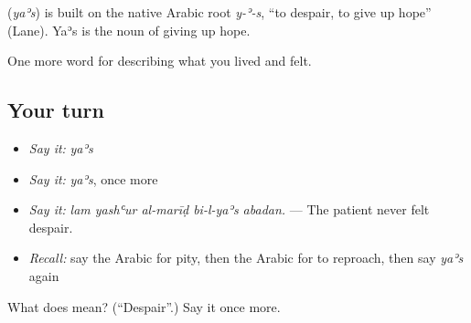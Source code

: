 \begin{cousinweb}
\textbf{} (\emph{yaʾs}) is built on the native Arabic root \emph{y-ʾ-s}, \textquotedblleft{}to despair, to give up hope\textquotedblright{} (Lane). Yaʾs is the noun of giving up hope.
\end{cousinweb}

\begin{grammarlens}[title={What you've built}]
One more word for describing what you lived and felt.
\end{grammarlens}

\subsection*{Your turn}
\begin{itemize}
\raggedright
  \item \emph{Say it:} \emph{yaʾs}
  \item \emph{Say it:} \emph{yaʾs}, once more
  \item \emph{Say it:} \emph{lam yashʿur al-marīḍ bi-l-yaʾs abadan.} — The patient never felt despair.
  \item \emph{Recall:} say the Arabic for pity, then the Arabic for to reproach, then say \emph{yaʾs} again
\end{itemize}

\begin{tcolorbox}[breakable,colback=teal!4,colframe=teal!35!black,title={Before you move on}]
What does  mean? (\textquotedblleft{}Despair\textquotedblright{}.) Say it once more.
\end{tcolorbox}
